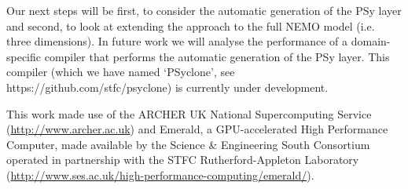 \documentclass[gmd, manuscript]{copernicus}
\begin{document}
Our next steps will be first, to consider the automatic generation of the
PSy layer and second, to look at extending the approach to the full NEMO
model (i.e. three dimensions). In future work we will analyse the
performance of a domain-specific compiler that performs the automatic
generation of the PSy layer. This compiler (which we have named
`PSyclone', see https://github.com/stfc/psyclone) is currently under
development.



\begin{acknowledgements}

This work made use of the ARCHER UK National Supercomputing Service
(\url{http://www.archer.ac.uk}) and Emerald, a GPU-accelerated High
Performance Computer, made available by the Science \& Engineering
South Consortium operated in partnership with the STFC
Rutherford-Appleton Laboratory
(\url{http://www.ses.ac.uk/high-performance-computing/emerald/}).

\end{acknowledgements}



\end{document}
